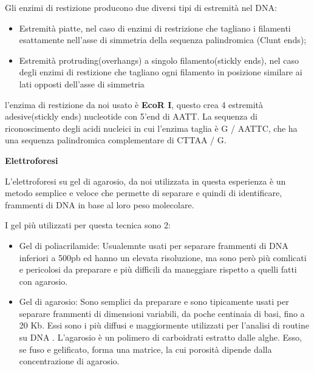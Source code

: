 Gli enzimi di restizione producono due diversi tipi di estremità nel DNA:
\begin{itemize}

	\item Estremità piatte, nel caso di enzimi di restrizione che tagliano i filamenti esattamente nell'asse di simmetria della sequenza palindromica (Clunt ends);
	\item Estremità protruding(overhangs) a singolo filamento(stickly ends), nel caso degli enzimi di restizione che tagliano ogni filamento in posizione similare ai lati opposti dell'asse di simmetria

\end{itemize}

l'enzima di restizione da noi usato è \textbf{EcoR I}, questo crea 4 estremità adesive(stickly ends) nucleotide con  5'end  di AATT. La sequenza di riconoscimento degli acidi nucleici in cui l'enzima taglia è G / ​​AATTC, che ha una sequenza palindromica complementare di CTTAA / G.

\vspace{0.5cm}


\textbf{Elettroforesi }

\vspace{0.3cm}



L'elettroforesi su gel di agarosio, da noi utilizzata in questa esperienza è un metodo semplice e veloce che permette di separare e quindi di identificare, frammenti di DNA in base al loro peso molecolare.

I gel più utilizzati per questa tecnica sono 2: 
\begin{itemize}

	\item{Gel di poliacrilamide: } Usualemnte usati per separare frammenti di DNA inferiori a 500pb ed hanno un elevata risoluzione, ma sono però più comlicati e pericolosi da preparare e più difficili da maneggiare rispetto a quelli fatti con agarosio.  
	
	\item{Gel di agarosio: } Sono semplici da preparare e sono tipicamente usati per separare frammenti di dimensioni variabili, da poche centinaia di basi, fino a 20 Kb. Essi sono i più diffusi e maggiormente utilizzati per l'analisi di routine su DNA .  L'agarosio è un polimero di carboidrati estratto dalle alghe. Esso, se fuso e gelificato, forma una matrice, la cui porosità dipende dalla concentrazione di agarosio.

\end{itemize}

